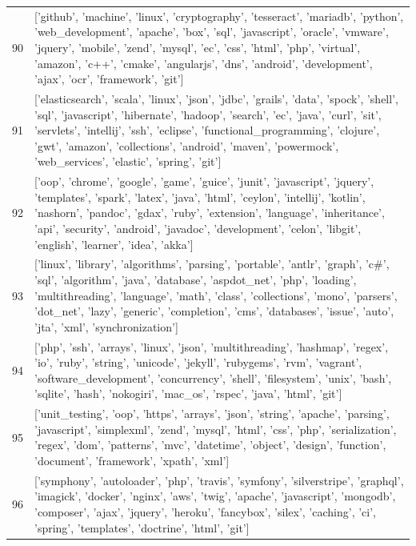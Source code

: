 \begin{center}
\begin{longtable}{|p{1.5cm}|p{12.5cm}|}
            90 & ['github', 'machine', 'linux', 'cryptography', 'tesseract', 'mariadb', 'python', 'web\_development', 'apache', 'box', 'sql', 'javascript', 'oracle', 'vmware', 'jquery', 'mobile', 'zend', 'mysql', 'ec', 'css', 'html', 'php', 'virtual', 'amazon', 'c++', 'cmake', 'angularjs', 'dns', 'android', 'development', 'ajax', 'ocr', 'framework', 'git']  \\ 
            91 & ['elasticsearch', 'scala', 'linux', 'json', 'jdbc', 'grails', 'data', 'spock', 'shell', 'sql', 'javascript', 'hibernate', 'hadoop', 'search', 'ec', 'java', 'curl', 'sit', 'servlets', 'intellij', 'ssh', 'eclipse', 'functional\_programming', 'clojure', 'gwt', 'amazon', 'collections', 'android', 'maven', 'powermock', 'web\_services', 'elastic', 'spring', 'git']  \\ 
            92 & ['oop', 'chrome', 'google', 'game', 'guice', 'junit', 'javascript', 'jquery', 'templates', 'spark', 'latex', 'java', 'html', 'ceylon', 'intellij', 'kotlin', 'nashorn', 'pandoc', 'gdax', 'ruby', 'extension', 'language', 'inheritance', 'api', 'security', 'android', 'javadoc', 'development', 'celon', 'libgit', 'english', 'learner', 'idea', 'akka']  \\ 
            93 & ['linux', 'library', 'algorithms', 'parsing', 'portable', 'antlr', 'graph', 'c\#', 'sql', 'algorithm', 'java', 'database', 'aspdot\_net', 'php', 'loading', 'multithreading', 'language', 'math', 'class', 'collections', 'mono', 'parsers', 'dot\_net', 'lazy', 'generic', 'completion', 'cms', 'databases', 'issue', 'auto', 'jta', 'xml', 'synchronization']  \\ 
            94 & ['php', 'ssh', 'arrays', 'linux', 'json', 'multithreading', 'hashmap', 'regex', 'io', 'ruby', 'string', 'unicode', 'jekyll', 'rubygems', 'rvm', 'vagrant', 'software\_development', 'concurrency', 'shell', 'filesystem', 'unix', 'bash', 'sqlite', 'hash', 'nokogiri', 'mac\_os', 'rspec', 'java', 'html', 'git']  \\ 
            95 & ['unit\_testing', 'oop', 'https', 'arrays', 'json', 'string', 'apache', 'parsing', 'javascript', 'simplexml', 'zend', 'mysql', 'html', 'css', 'php', 'serialization', 'regex', 'dom', 'patterns', 'mvc', 'datetime', 'object', 'design', 'function', 'document', 'framework', 'xpath', 'xml']  \\ 
            96 & ['symphony', 'autoloader', 'php', 'travis', 'symfony', 'silverstripe', 'graphql', 'imagick', 'docker', 'nginx', 'aws', 'twig', 'apache', 'javascript', 'mongodb', 'composer', 'ajax', 'jquery', 'heroku', 'fancybox', 'silex', 'caching', 'ci', 'spring', 'templates', 'doctrine', 'html', 'git']  \\ 

\end{longtable}
\end{center}

